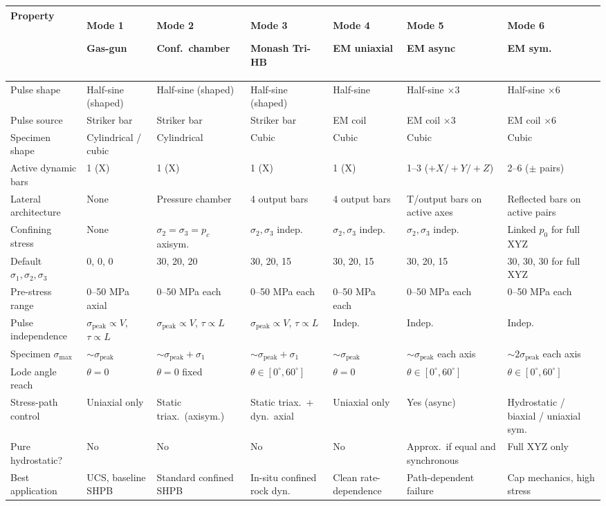 \documentclass[11pt,a4paper,openany]{book}
\theoremstyle{handbook}
\newcommand{\sig}{\sigma}
\newcommand{\sigpeak}{\sig_{\text{peak}}}
\begin{document}
\begin{center}
\renewcommand{\arraystretch}{1.4}
\scriptsize
\begin{tabular}{@{}p{2.5cm}p{1.55cm}p{1.55cm}p{1.55cm}p{1.55cm}p{1.55cm}p{1.55cm}@{}}
\toprule
\textbf{Property} & \textbf{Mode 1} \par Gas-gun & \textbf{Mode 2} \par Conf.\ chamber & \textbf{Mode 3} \par Monash Tri-HB & \textbf{Mode 4} \par EM uniaxial & \textbf{Mode 5} \par EM async & \textbf{Mode 6} \par EM sym.\\
\midrule
Pulse shape & Half-sine (shaped) & Half-sine (shaped) & Half-sine (shaped) & Half-sine & Half-sine $\times 3$ & Half-sine $\times 6$ \\
Pulse source & Striker bar & Striker bar & Striker bar & EM coil & EM coil $\times 3$ & EM coil $\times 6$ \\
Specimen shape & Cylindrical / cubic & Cylindrical & Cubic & Cubic & Cubic & Cubic \\
Active dynamic bars & 1 (X) & 1 (X) & 1 (X) & 1 (X) & 1--3 ($+X/+Y/+Z$) & 2--6 ($\pm$ pairs) \\
Lateral architecture & None & Pressure chamber & 4 output bars & 4 output bars & T/output bars on active axes & Reflected bars on active pairs \\
Confining stress & None & $\sig_2{=}\sig_3{=}p_c$ axisym. & $\sig_2,\sig_3$ indep.\ & $\sig_2,\sig_3$ indep.\ & $\sig_2,\sig_3$ indep.\ & Linked $p_0$ for full XYZ \\
Default $\sig_1,\sig_2,\sig_3$ & 0, 0, 0 & 30, 20, 20 & 30, 20, 15 & 30, 20, 15 & 30, 20, 15 & 30, 30, 30 for full XYZ \\
Pre-stress range & 0--50 MPa axial & 0--50 MPa each & 0--50 MPa each & 0--50 MPa each & 0--50 MPa each & 0--50 MPa each \\
Pulse independence & $\sigpeak{\propto}V$, $\tau{\propto}L$ & $\sigpeak{\propto}V$, $\tau{\propto}L$ & $\sigpeak{\propto}V$, $\tau{\propto}L$ & Indep. & Indep. & Indep. \\
Specimen $\sig_{\max}$ & ${\sim}\sigpeak$ & ${\sim}\sigpeak{+}\sig_1$ & ${\sim}\sigpeak{+}\sig_1$ & ${\sim}\sigpeak$ & ${\sim}\sigpeak$ each axis & ${\sim}2\sigpeak$ each axis \\
Lode angle reach & $\theta=0$ & $\theta=0$ fixed & $\theta\in[0^\circ,60^\circ]$ & $\theta=0$ & $\theta\in[0^\circ,60^\circ]$ & $\theta\in[0^\circ,60^\circ]$ \\
Stress-path control & Uniaxial only & Static triax.\ (axisym.) & Static triax.\ + dyn.\ axial & Uniaxial only & Yes (async) & Hydrostatic / biaxial / uniaxial sym. \\
Pure hydrostatic? & No & No & No & No & Approx.\ if equal and synchronous & Full XYZ only \\
Best application & UCS, baseline SHPB & Standard confined SHPB & In-situ confined rock dyn. & Clean rate-dependence & Path-dependent failure & Cap mechanics, high stress \\
\bottomrule
\end{tabular}
\end{center}
\end{document}
